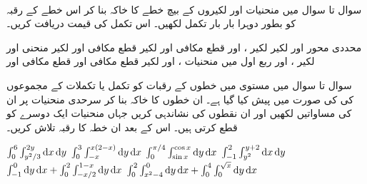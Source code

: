 \\
سوال  تا سوال  میں  منحنیات اور لکیروں کے بیچ خطے کا خاکہ بنا کر اس خطے کے رقبہ کو بطور دوہرا بار بار  تکمل لکھیں۔ اس تکمل کی قیمت دریافت کریں۔

محددی محور اور لکیر 
لکیر ،  اور 
قطع  مکافی  اور لکیر 
قطع مکافی  اور لکیر 
منحنی  اور لکیر ،  اور 
ربع اول میں منحنیات ،  اور لکیر 
قطع مکافی  اور 
قطع مکافی  اور 

سوال  تا سوال  میں مستوی  میں   خطوں کے رقبات کو تکمل یا تکملات کے مجموعوں کی کی صورت میں پیش کیا گیا ہے۔  ان خطوں کا خاکہ بنا کر    سرحدی منحنیات  پر ان  کی مساواتیں لکھیں اور ان نقطوں کی نشاندہی کریں جہاں منحنیات ایک دوسرے کو قطع کرتی ہیں۔ اس کے بعد ان خطہ کا رقبہ تلاش کریں۔ 

$\int_0^6\int_{y^2/3}^{2y}\dif x\dif y$
$\int_0^3\int_{-x}^{x(2-x)}\dif y\dif x$
$\int_0^{\pi/4}\int_{\sin x}^{\cos x}\dif y\dif x$
$\int_{-1}^2\int_{y^2}^{y+2}\dif x\dif y$
$\int_{-1}^0\dif y\dif x+\int_0^2\int_{-x/2}^{1-x}\dif y\dif x$
$\int_0^2\int_{x^2-4}^0\dif y\dif x+\int_0^4\int_0^{\sqrt{x}}\dif y\dif x$

